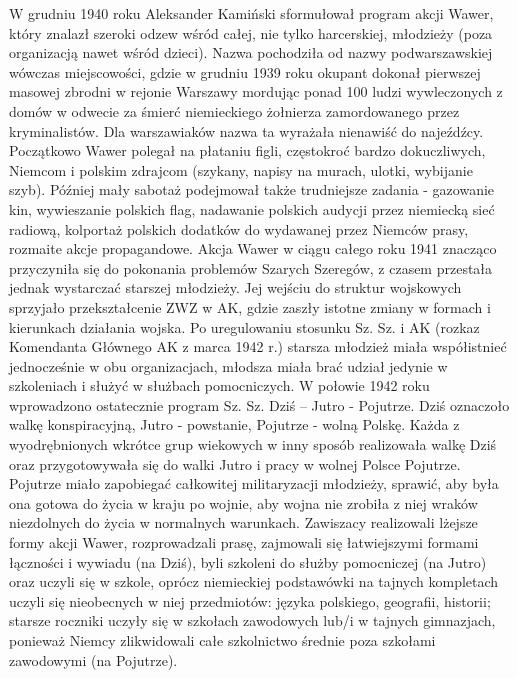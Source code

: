 W grudniu 1940 roku Aleksander Kamiński sformułował program akcji Wawer, który znalazł szeroki odzew wśród całej, nie tylko harcerskiej, młodzieży (poza organizacją nawet wśród dzieci). Nazwa pochodziła od nazwy podwarszawskiej wówczas miejscowości, gdzie w grudniu 1939 roku okupant dokonał pierwszej masowej zbrodni w rejonie Warszawy mordując ponad 100 ludzi wywleczonych z domów w odwecie za śmierć niemieckiego żołnierza zamordowanego przez kryminalistów. Dla warszawiaków nazwa ta wyrażała nienawiść do najeźdźcy. Początkowo Wawer polegał na płataniu figli, częstokroć bardzo dokuczliwych, Niemcom i polskim zdrajcom (szykany, napisy na murach, ulotki, wybijanie szyb). Później mały sabotaż podejmował także trudniejsze zadania - gazowanie kin, wywieszanie polskich flag, nadawanie polskich audycji przez niemiecką sieć radiową, kolportaż polskich dodatków do wydawanej przez Niemców prasy, rozmaite akcje propagandowe. Akcja Wawer w ciągu całego roku 1941 znacząco przyczyniła się do pokonania problemów Szarych Szeregów, z czasem przestała jednak wystarczać starszej młodzieży. Jej wejściu do struktur wojskowych sprzyjało przekształcenie ZWZ w AK, gdzie zaszły istotne zmiany w formach i kierunkach działania wojska. Po uregulowaniu stosunku Sz. Sz. i AK (rozkaz Komendanta Głównego AK z marca 1942 r.) starsza młodzież miała współistnieć jednocześnie w obu organizacjach, młodsza miała brać udział jedynie w szkoleniach i służyć w służbach pomocniczych. W połowie 1942 roku wprowadzono ostatecznie program Sz. Sz. Dziś – Jutro - Pojutrze. Dziś oznaczoło walkę konspiracyjną, Jutro - powstanie, Pojutrze - wolną Polskę. Każda z wyodrębnionych wkrótce grup wiekowych w inny sposób realizowała walkę Dziś oraz przygotowywała się do walki Jutro i pracy w wolnej Polsce Pojutrze. Pojutrze miało zapobiegać całkowitej militaryzacji młodzieży, sprawić, aby była ona gotowa do życia w kraju po wojnie, aby wojna nie zrobiła z niej wraków niezdolnych do życia w normalnych warunkach. Zawiszacy realizowali lżejsze formy akcji Wawer, rozprowadzali prasę, zajmowali się łatwiejszymi formami łączności i wywiadu (na Dziś), byli szkoleni do służby pomocniczej (na Jutro) oraz uczyli się w szkole, oprócz niemieckiej podstawówki na tajnych kompletach uczyli się nieobecnych w niej przedmiotów: języka polskiego, geografii, historii; starsze roczniki uczyły się w szkołach zawodowych lub/i w tajnych gimnazjach, ponieważ Niemcy zlikwidowali całe szkolnictwo średnie poza szkołami zawodowymi (na Pojutrze).

